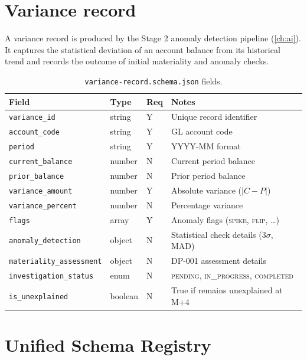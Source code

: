 \section{Variance record}\label{sec:variance-schema}

A variance record is produced by the Stage 2 anomaly detection pipeline
(\cref{ch:ai}). It captures the statistical deviation of an account
balance from its historical trend and records the outcome of initial
materiality and anomaly checks.

\begin{table}[htbp]
\caption{\texttt{variance-record.schema.json} fields.}\label{tab:variance-fields}
\centering
\small
\begin{tabularx}{\linewidth}{@{}lllX@{}}
\toprule
\textbf{Field} & \textbf{Type} & \textbf{Req} & \textbf{Notes} \\ \midrule
\texttt{variance\_id}       & string  & Y & Unique record identifier \\
\texttt{account\_code}      & string  & Y & GL account code \\
\texttt{period}             & string  & Y & YYYY-MM format \\
\texttt{current\_balance}   & number  & N & Current period balance \\
\texttt{prior\_balance}     & number  & N & Prior period balance \\
\texttt{variance\_amount}   & number  & Y & Absolute variance ($|C - P|$) \\
\texttt{variance\_percent}  & number  & N & Percentage variance \\
\texttt{flags}              & array   & Y & Anomaly flags (\textsc{spike}, \textsc{flip}, \dots) \\
\texttt{anomaly\_detection}  & object  & N & Statistical check details (3$\sigma$, MAD) \\
\texttt{materiality\_assessment} & object  & N & DP-001 assessment details \\
\texttt{investigation\_status}   & enum    & N & \textsc{pending}, \textsc{in\_progress}, \textsc{completed} \\
\texttt{is\_unexplained}     & boolean & N & True if remains unexplained at M+4 \\
\bottomrule
\end{tabularx}
\end{table}

\section{Unified Schema Registry}

